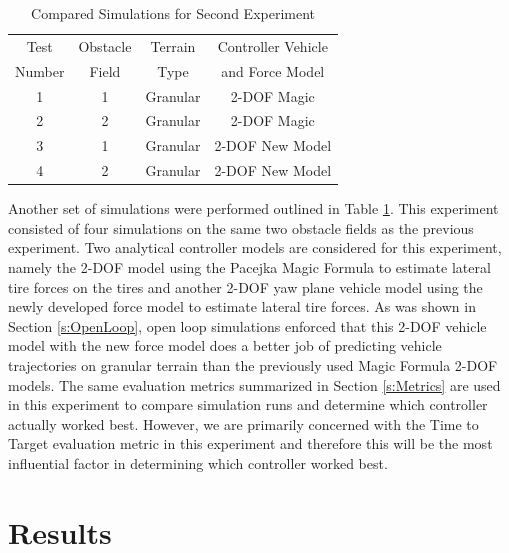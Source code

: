 \documentclass[12pt,onecolumn]{report}
\begin{document}
\begin{table}
\begin{center}
	\begin{tabular}{||c |c | c | c||} 
		\hline
		Test  & Obstacle & Terrain  & Controller Vehicle \\
		Number &  Field & Type & and Force Model\\ [0.5ex] 	
		\hline\hline
		1 & 1 & Granular & 2-DOF Magic\\ 
		\hline
		2 & 2 & Granular & 2-DOF Magic\\
		\hline
		3 & 1 & Granular & 2-DOF New Model\\
		\hline
		4 & 2 & Granular & 2-DOF New Model\\
		\hline
	\end{tabular}
\end{center}
\caption{Compared Simulations for Second Experiment}
\label{t:TestMatrix2}
\end{table}

Another set of simulations were performed outlined in Table \ref{t:TestMatrix2}. This experiment consisted of four simulations on the same two obstacle fields as the previous experiment. Two analytical controller models are considered for this experiment, namely the 2-DOF model using the Pacejka Magic Formula to estimate lateral tire forces on the tires and another 2-DOF yaw plane vehicle model using the newly developed force model to estimate lateral tire forces. As was shown in Section \ref{s:OpenLoop}, open loop simulations enforced that this 2-DOF vehicle model with the new force model does a better job of predicting vehicle trajectories on granular terrain than the previously used Magic Formula 2-DOF models. The same evaluation metrics summarized in Section \ref{s:Metrics} are used in this experiment to compare simulation runs and determine which controller actually worked best. However, we are primarily concerned with the Time to Target evaluation metric in this experiment and therefore this will be the most influential factor in determining which controller worked best. 

\section{Results}\label{s:Results2}
\end{document}
